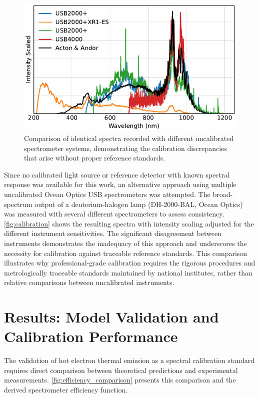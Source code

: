 \documentclass[
	parskip=half,
	a4paper,
]{scrarticle}
\begin{document}
\begin{figure}
    \centering
    \includegraphics{../analysis/figures/efficiency_different.pdf}
    \caption{Comparison of identical spectra recorded with different uncalibrated spectrometer systems, demonstrating the calibration discrepancies that arise without proper reference standards.}
    \label{fig:calibration}
\end{figure}

Since no calibrated light source or reference detector with known spectral response was available for this work, an alternative approach using multiple uncalibrated Ocean Optics USB spectrometers was attempted. The broad-spectrum output of a deuterium-halogen lamp (DH-2000-BAL, Ocean Optics) was measured with several different spectrometers to assess consistency. \autoref{fig:calibration} shows the resulting spectra with intensity scaling adjusted for the different instrument sensitivities. The significant disagreement between instruments demonstrates the inadequacy of this approach and underscores the necessity for calibration against traceable reference standards. This comparison illustrates why professional-grade calibration requires the rigorous procedures and metrologically traceable standards maintained by national institutes, rather than relative comparisons between uncalibrated instruments.

\section{Results: Model Validation and Calibration Performance}

The validation of hot electron thermal emission as a spectral calibration standard requires direct comparison between theoretical predictions and experimental measurements. \autoref{fig:efficiency_comparison} presents this comparison and the derived spectrometer efficiency function.
\end{document}
